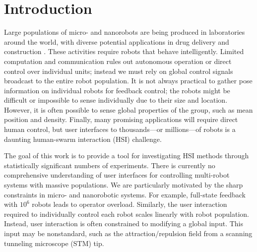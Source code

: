 \section{Introduction}\label{sec:Intro}


Large populations of micro- and nanorobots are being produced in laboratories around the world, with diverse potential applications in drug delivery and construction \cite{Peyer2013,Shirai2005,Chiang2011}. These activities require robots that behave intelligently.
Limited computation and communication rules out autonomous operation or direct control over individual units; instead we must rely on global control signals broadcast to the entire robot population.  It is not always practical to gather pose information on individual robots for feedback control; the robots might be difficult or impossible to sense individually due to their size and location. However, it is often possible to sense global properties of the group, such as mean position and density.  Finally, many promising applications will require direct human control, but user interfaces to thousands---or millions---of robots is a daunting human-swarm interaction (HSI) challenge. 

The goal of this work is to provide a tool for investigating HSI methods through statistically significant numbers of experiments.  There is currently no comprehensive understanding of user interfaces for controlling multi-robot systems with massive populations.  We are particularly motivated by the sharp constraints in micro- and nanorobotic systems.  For example, full-state feedback with $10^6$ robots leads to operator overload.  
Similarly, the user interaction required to individually control each robot scales linearly with robot population.   
Instead, user interaction is often constrained to modifying a global input. This input may be nonstandard, such as the attraction/repulsion field from a scanning tunneling microscope (STM) tip. 

